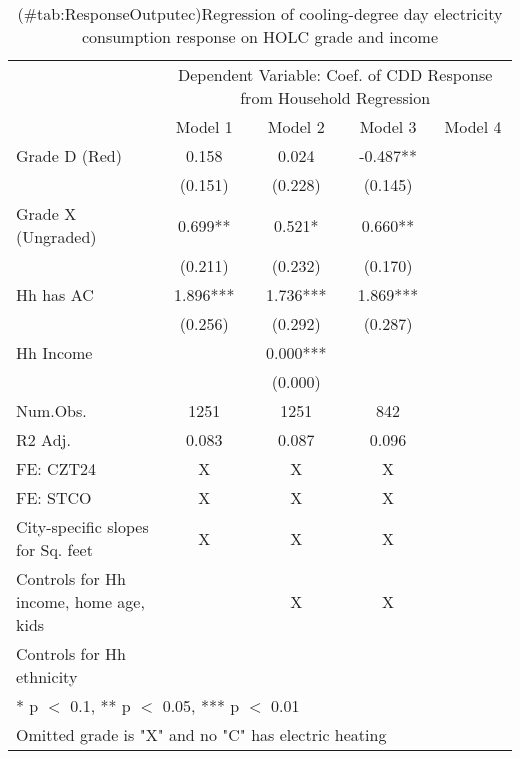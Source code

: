 \documentclass[border=1mm, preview]{standalone}
\begin{document}
\begin{table}

\caption{(\#tab:ResponseOutputec)Regression of cooling-degree day electricity consumption response on HOLC grade and income\label{tab:responseelectric1}}
\centering
\begin{tabular}[t]{lccc>{}c}
\toprule
\multicolumn{1}{c}{ } & \multicolumn{4}{c}{Dependent Variable: Coef. of CDD Response from Household Regression} \\
\cmidrule(l{3pt}r{3pt}){2-5}
  & Model 1 & Model 2 & Model 3 & Model 4\\
\midrule
Grade D (Red) & 0.158 & 0.024 & -0.487** & \cellcolor{blue}{\textcolor{white}{-0.792*}}\\
 & (0.151) & (0.228) & (0.145) & \cellcolor{blue}{\textcolor{white}{(0.391)}}\\
Grade X (Ungraded) & 0.699** & 0.521* & 0.660** & \cellcolor{blue}{\textcolor{white}{0.243}}\\
 & (0.211) & (0.232) & (0.170) & \cellcolor{blue}{\textcolor{white}{(0.361)}}\\
Hh has AC & 1.896*** & 1.736*** & 1.869*** & \cellcolor{blue}{\textcolor{white}{1.727***}}\\
 & (0.256) & (0.292) & (0.287) & \cellcolor{blue}{\textcolor{white}{(0.358)}}\\
Hh Income &  & 0.000*** &  & \cellcolor{blue}{\textcolor{white}{0.000***}}\\
 &  & (0.000) &  & \cellcolor{blue}{\textcolor{white}{(0.000)}}\\
\midrule
Num.Obs. & 1251 & 1251 & 842 & \cellcolor{blue}{\textcolor{white}{776}}\\
R2 Adj. & 0.083 & 0.087 & 0.096 & \cellcolor{blue}{\textcolor{white}{0.103}}\\
FE: CZT24 & X & X & X & \cellcolor{blue}{\textcolor{white}{X}}\\
FE: STCO & X & X & X & \cellcolor{blue}{\textcolor{white}{X}}\\
City-specific slopes for Sq. feet & X & X & X & \cellcolor{blue}{\textcolor{white}{X}}\\
Controls for Hh income, home age, kids &  & X & X & \cellcolor{blue}{\textcolor{white}{X}}\\
Controls for Hh ethnicity &  &  &  & \cellcolor{blue}{\textcolor{white}{X}}\\
\bottomrule
\multicolumn{5}{l}{\textsuperscript{} * p $<$ 0.1, ** p $<$ 0.05, *** p $<$ 0.01}\\
\multicolumn{5}{l}{\textsuperscript{} Omitted grade is "X" and no "C" has electric heating}\\
\end{tabular}
\end{table}
\end{document}
